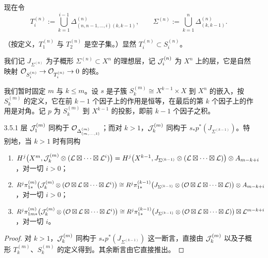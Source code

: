 现在令
\begin{equation*}
T^{(n)}_i:=\bigcup_{k=1}^{i-1}\Delta^{(n)}_{(n,n-1,\ldots,i)(k,k-1)},
\qquad
\Sigma^{(n)}:=\bigcup_{k=1}^{n}\Delta^{(n)}_{(k,k-1)}.
\end{equation*}

（按定义，$T^{(n)}_1$ 与 $T^{(n)}_2$ 是空子集。）显然 $T^{(n)}_i\subset S^{(n)}_i$。

我们记 $J_{\Sigma^{(n)}}$ 为子概形 $\Sigma^{(n)}\subset X^n$ 的理想层，记 $\mathcal{J}^{(n)}_i$ 为 $X^n$ 上的层，它是自然映射 $\mathcal{O}_{S^{(n)}_i}\to\mathcal{O}_{T^{(n)}_i}\to 0$ 的核。


我们暂时固定 $m$ 与 $k\leqslant m$。设 $s$ 是子簇 $S^{(m)}_k\cong X^{k-1}\times X$ 到 $X^n$ 的嵌入，按 $S^{(m)}_k$ 的定义，它在前 $k-1$ 个因子上的作用是恒等，在最后的第 $k$ 个因子上的作用是对角。记 $p$ 为 $S^{(m)}_k$ 到 $X^{k-1}$ 的投影，即前 $k-1$ 个因子之积。


\begin{lemma}{3.5.1}
层 $\mathcal{J}^{(m)}_1$ 同构于 $\mathcal{O}_{\Delta^{(m)}_{(m,\ldots,1)}}$；而对 $k>1$，$\mathcal{J}^{(m)}_k$ 同构于 $s_*p^*(J_{\Sigma^{(k-1)}})$。特别地，当 $k>1$ 时有同构
\begin{enumerate}[label=\alph*),leftmargin=2.8em,itemsep=2pt,topsep=2pt]
\item $H^j\bigl(X^m,\mathcal{J}^{(m)}_k\otimes(\mathcal{L}\boxtimes\cdots\boxtimes\mathcal{L}^i)\bigr)
=H^j\bigl(X^{k-1},J_{\Sigma^{(k-1)}}\otimes(\mathcal{L}\boxtimes\cdots\boxtimes\mathcal{L})\bigr)\otimes A_{m-k+i}$，对一切 $i>0$；
\item $R^j\pi^{(m)}_{1*}\bigl(\mathcal{J}^{(m)}_k\otimes(\mathcal{O}\boxtimes\mathcal{L}\boxtimes\cdots\boxtimes\mathcal{L}^i)\bigr)
\cong R^j\pi^{(k-1)}_{1*}\bigl(J_{\Sigma^{(k-1)}}\otimes(\mathcal{O}\boxtimes\mathcal{L}\boxtimes\cdots\boxtimes\mathcal{L})\bigr)\otimes A_{m-k+i}$，对一切 $i>0$；
\item $R^j\pi^{(m)}_{1m*}\bigl(\mathcal{J}^{(m)}_k\otimes(\mathcal{O}\boxtimes\mathcal{L}\boxtimes\cdots\boxtimes\mathcal{L}^i)\bigr)
\cong R^j\pi^{(k-1)}_{1*}\bigl(J_{\Sigma^{(k-1)}}\otimes(\mathcal{O}\boxtimes\mathcal{L}\boxtimes\cdots\boxtimes\mathcal{L})\bigr)\boxtimes\mathcal{L}^{m-k+i}$，对一切 $i$。
\end{enumerate}
\end{lemma}

\begin{proof}
对 $k>1$，$\mathcal{J}^{(m)}_k$ 同构于 $s_*p^*(J_{\Sigma^{(k-1)}})$ 这一断言，直接由 $\mathcal{J}^{(m)}_k$ 以及子概形 $T^{(m)}_k$、$S^{(m)}_k$ 的定义得到。其余断言由它直接推出。
\end{proof}

